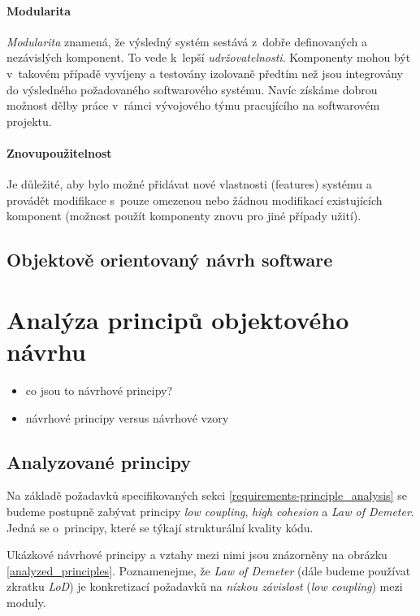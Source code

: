\paragraph{Modularita} \emph{Modularita} znamená, že výsledný systém sestává z~dobře definovaných a nezávislých komponent. To vede k~lepší \emph{udržovatelnosti}. Komponenty mohou být v~takovém případě vyvíjeny a testovány izolovaně předtím než jsou integrovány do výsledného požadovaného softwarového systému. Navíc získáme dobrou možnost dělby práce v~rámci vývojového týmu pracujícího na softwarovém projektu.

\paragraph{Znovupoužitelnost} Je důležité, aby bylo možné přidávat nové vlastnosti (features) systému a provádět modifikace s~pouze omezenou nebo žádnou modifikací existujících komponent (možnost použít komponenty znovu pro jiné případy užití).

\subsection{Objektově orientovaný návrh software}

\section{Analýza principů objektového návrhu}

\begin{itemize}
\item co jsou to návrhové principy?
\item návrhové principy versus návrhové vzory \cite{612257}
\end{itemize}

\subsection{Analyzované principy}
Na základě požadavků specifikovaných sekci \ref{requirements-principle_analysis} se budeme postupně zabývat principy \emph{low coupling}, \emph{high cohesion} a \emph{Law of Demeter}. Jedná se o~principy, které se týkají strukturální kvality kódu.

Ukázkové návrhové principy a vztahy mezi nimi jsou znázorněny na obrázku \ref{analyzed_principles}. Poznamenejme, že \emph{Law of Demeter} (dále budeme používat zkratku \emph{LoD}) je konkretizací požadavků na \emph{nízkou závislost} (\emph{low coupling}) mezi moduly.

